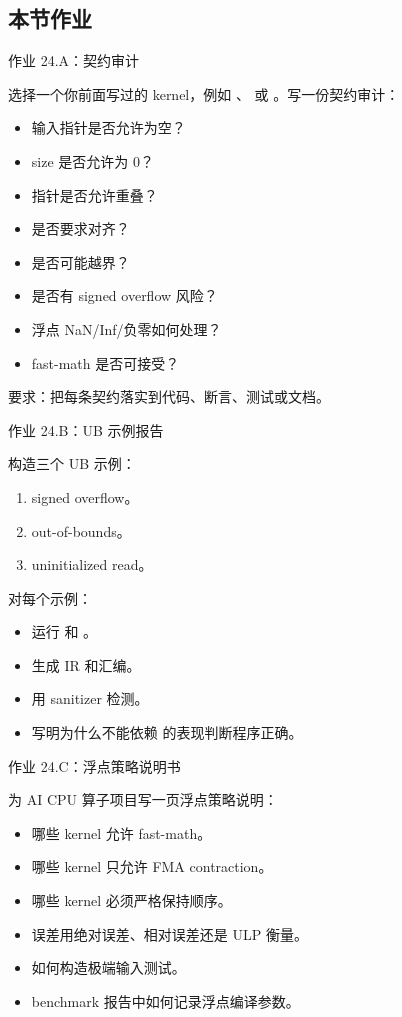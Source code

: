 \subsection{本节作业}

\begin{exercisebox}
作业 24.A：契约审计

选择一个你前面写过的 kernel，例如 、 或 。写一份契约审计：

\begin{itemize}
  \item 输入指针是否允许为空？
  \item size 是否允许为 0？
  \item 指针是否允许重叠？
  \item 是否要求对齐？
  \item 是否可能越界？
  \item 是否有 signed overflow 风险？
  \item 浮点 NaN/Inf/负零如何处理？
  \item fast-math 是否可接受？
\end{itemize}

要求：把每条契约落实到代码、断言、测试或文档。
\end{exercisebox}

\begin{exercisebox}
作业 24.B：UB 示例报告

构造三个 UB 示例：

\begin{enumerate}
  \item signed overflow。
  \item out-of-bounds。
  \item uninitialized read。
\end{enumerate}

对每个示例：

\begin{itemize}
  \item 运行  和 。
  \item 生成 IR 和汇编。
  \item 用 sanitizer 检测。
  \item 写明为什么不能依赖  的表现判断程序正确。
\end{itemize}
\end{exercisebox}

\begin{exercisebox}
作业 24.C：浮点策略说明书

为 AI CPU 算子项目写一页浮点策略说明：

\begin{itemize}
  \item 哪些 kernel 允许 fast-math。
  \item 哪些 kernel 只允许 FMA contraction。
  \item 哪些 kernel 必须严格保持顺序。
  \item 误差用绝对误差、相对误差还是 ULP 衡量。
  \item 如何构造极端输入测试。
  \item benchmark 报告中如何记录浮点编译参数。
\end{itemize}
\end{exercisebox}

